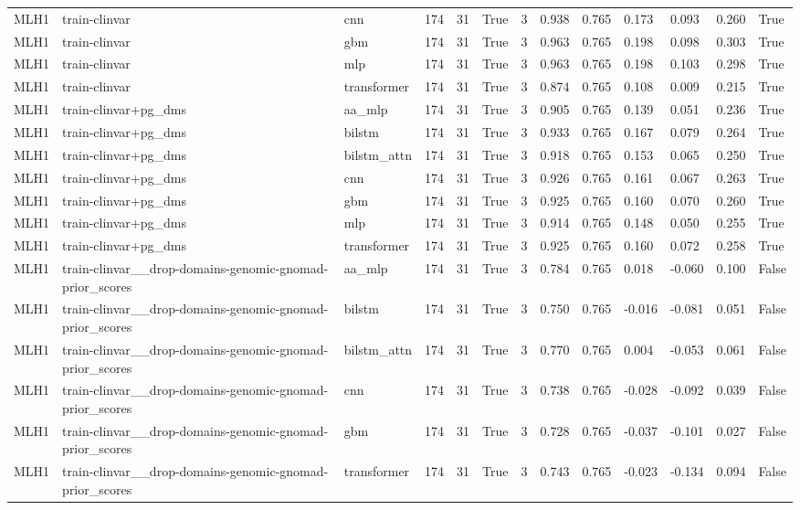 \begin{table}[t]
\begin{tabular}{lllllllllllll}
MLH1 & train-clinvar & cnn & 174 & 31 & True & 3 & 0.938 & 0.765 & 0.173 & 0.093 & 0.260 & True \\
MLH1 & train-clinvar & gbm & 174 & 31 & True & 3 & 0.963 & 0.765 & 0.198 & 0.098 & 0.303 & True \\
MLH1 & train-clinvar & mlp & 174 & 31 & True & 3 & 0.963 & 0.765 & 0.198 & 0.103 & 0.298 & True \\
MLH1 & train-clinvar & transformer & 174 & 31 & True & 3 & 0.874 & 0.765 & 0.108 & 0.009 & 0.215 & True \\
MLH1 & train-clinvar+pg\_dms & aa\_mlp & 174 & 31 & True & 3 & 0.905 & 0.765 & 0.139 & 0.051 & 0.236 & True \\
MLH1 & train-clinvar+pg\_dms & bilstm & 174 & 31 & True & 3 & 0.933 & 0.765 & 0.167 & 0.079 & 0.264 & True \\
MLH1 & train-clinvar+pg\_dms & bilstm\_attn & 174 & 31 & True & 3 & 0.918 & 0.765 & 0.153 & 0.065 & 0.250 & True \\
MLH1 & train-clinvar+pg\_dms & cnn & 174 & 31 & True & 3 & 0.926 & 0.765 & 0.161 & 0.067 & 0.263 & True \\
MLH1 & train-clinvar+pg\_dms & gbm & 174 & 31 & True & 3 & 0.925 & 0.765 & 0.160 & 0.070 & 0.260 & True \\
MLH1 & train-clinvar+pg\_dms & mlp & 174 & 31 & True & 3 & 0.914 & 0.765 & 0.148 & 0.050 & 0.255 & True \\
MLH1 & train-clinvar+pg\_dms & transformer & 174 & 31 & True & 3 & 0.925 & 0.765 & 0.160 & 0.072 & 0.258 & True \\
MLH1 & train-clinvar\_\_drop-domains-genomic-gnomad-prior\_scores & aa\_mlp & 174 & 31 & True & 3 & 0.784 & 0.765 & 0.018 & -0.060 & 0.100 & False \\
MLH1 & train-clinvar\_\_drop-domains-genomic-gnomad-prior\_scores & bilstm & 174 & 31 & True & 3 & 0.750 & 0.765 & -0.016 & -0.081 & 0.051 & False \\
MLH1 & train-clinvar\_\_drop-domains-genomic-gnomad-prior\_scores & bilstm\_attn & 174 & 31 & True & 3 & 0.770 & 0.765 & 0.004 & -0.053 & 0.061 & False \\
MLH1 & train-clinvar\_\_drop-domains-genomic-gnomad-prior\_scores & cnn & 174 & 31 & True & 3 & 0.738 & 0.765 & -0.028 & -0.092 & 0.039 & False \\
MLH1 & train-clinvar\_\_drop-domains-genomic-gnomad-prior\_scores & gbm & 174 & 31 & True & 3 & 0.728 & 0.765 & -0.037 & -0.101 & 0.027 & False \\
MLH1 & train-clinvar\_\_drop-domains-genomic-gnomad-prior\_scores & transformer & 174 & 31 & True & 3 & 0.743 & 0.765 & -0.023 & -0.134 & 0.094 & False \\

\end{tabular}
\end{table}
